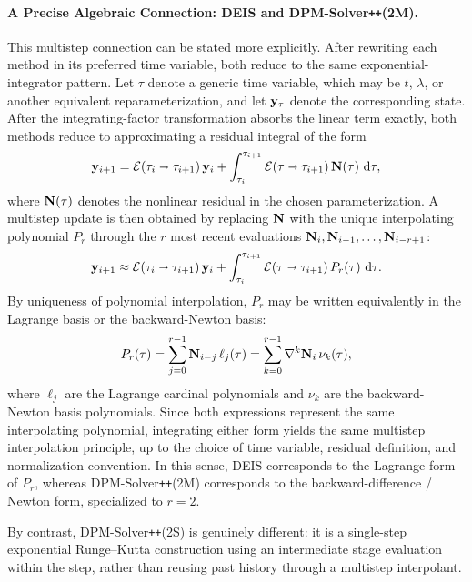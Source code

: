 \paragraph{A Precise Algebraic Connection: DEIS and
DPM-Solver\texttt{++}(2M).}
This multistep connection can be stated more explicitly. After rewriting
each method in its preferred time variable, both reduce to the same
exponential-integrator pattern. Let \(\tau\) denote a generic time
variable, which may be \(t\), \(\lambda\), or another equivalent
reparameterization, and let \({\mathbf{y}}_\tau\) denote the corresponding
state. After the integrating-factor transformation absorbs the linear
term exactly, both methods reduce to approximating a residual integral
of the form
\[
{\mathbf{y}}_{i+1}
= \mathcal{E}(\tau_i \shortrightarrow \tau_{i+1})\,{\mathbf{y}}_i
+ \int_{\tau_i}^{\tau_{i+1}}
  \mathcal{E}(\tau \shortrightarrow \tau_{i+1})\,
  {\mathbf{N}}(\tau)\,\mathop{}\!\mathrm{d}\tau,
\]
where \({\mathbf{N}}(\tau)\) denotes the nonlinear residual in the chosen
parameterization. A multistep update is then obtained by replacing
\({\mathbf{N}}\) with the unique interpolating polynomial \(P_r\) through the
\(r\) most recent evaluations
\({\mathbf{N}}_i,{\mathbf{N}}_{i-1},\ldots,{\mathbf{N}}_{i-r+1}\):
\[
{\mathbf{y}}_{i+1}
\approx \mathcal{E}(\tau_i \shortrightarrow \tau_{i+1})\,{\mathbf{y}}_i
+ \int_{\tau_i}^{\tau_{i+1}}
  \mathcal{E}(\tau \shortrightarrow \tau_{i+1})\,
  P_r(\tau)\,\mathop{}\!\mathrm{d}\tau.
\]
By uniqueness of polynomial interpolation, \(P_r\) may be written
equivalently in the Lagrange basis or the backward-Newton basis:
\[
P_r(\tau)
= \sum_{j=0}^{r-1} {\mathbf{N}}_{i-j}\,\ell_j(\tau)
= \sum_{k=0}^{r-1} \nabla^k {\mathbf{N}}_i\,\nu_k(\tau),
\]
where \(\ell_j\) are the Lagrange cardinal polynomials and \(\nu_k\) are
the backward-Newton basis polynomials. Since both expressions represent
the same interpolating polynomial, integrating either form yields the
same multistep interpolation principle, up to the choice of time
variable, residual definition, and normalization convention. In this
sense, DEIS corresponds to the Lagrange form of \(P_r\), whereas
DPM-Solver\texttt{++}(2M) corresponds to the backward-difference /
Newton form, specialized to \(r=2\).

By contrast, DPM-Solver\texttt{++}(2S) is genuinely different: it is a
single-step exponential Runge--Kutta construction using an intermediate
stage evaluation within the step, rather than reusing past history
through a multistep interpolant.

\clearpage
\newpage


